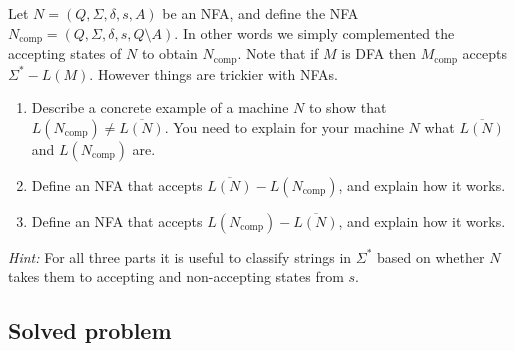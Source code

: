 \documentclass[11pt]{article}
\newcommand{\comp}[1]{#1_{\text{comp}}}
\begin{document}
\begin{enumerate}
  Let $N = (Q,\Sigma,\delta,s,A)$ be an NFA, and define the NFA
  $\comp{N} = (Q,\Sigma,\delta,s,Q\setminus A)$. In other words we
  simply complemented the accepting states of $N$ to obtain
  $\comp{N}$.  Note that if $M$ is DFA then $\comp{M}$ accepts
  $\Sigma^* - L(M)$. However things are trickier with NFAs.

\begin{enumerate}
\item Describe a concrete example of a machine $N$
  to show that $L(\comp{N}) \neq \overline{L(N)}$. You need
  to explain for your machine $N$ what $\overline{L(N)}$ and
  $L(\comp{N})$ are.

\item
Define an NFA that accepts
$\overline{L(N)} - L(\comp{N})$, and explain how it works.

\item
Define an NFA that accepts
$L(\comp{N}) - \overline{L(N)}$, and explain how it works.
\end{enumerate}

{\em Hint:} For all three parts it is useful to classify strings in $\Sigma^*$
based on whether $N$ takes them to accepting and non-accepting states
from $s$.


\end{enumerate}

\newpage
\subsection*{Solved problem}
\end{document}
